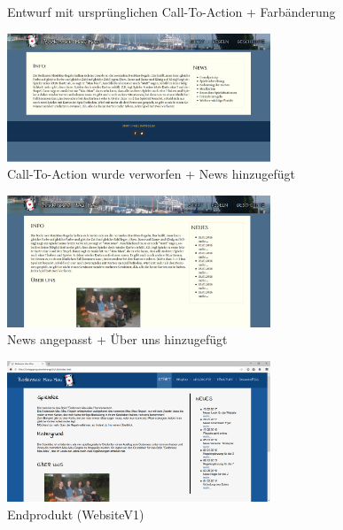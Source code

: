 \documentclass{scrartcl}
\begin{document}
\begin{enumerate}
\begin{description}
\begin{figure}[H]
\caption{Entwurf mit ursprünglichen Call-To-Action + Farbänderung}
\end{figure}
\begin{figure}[H]
 \centering
   \includegraphics[width=0.7\textwidth]{index2.png}
\caption{Call-To-Action wurde verworfen + News hinzugefügt}
\end{figure}
\begin{figure}[H]
 \centering
   \includegraphics[width=0.7\textwidth]{index3.png}
\caption{News angepasst + Über uns hinzugefügt}
\end{figure}
\begin{figure}[H]
 \centering
   \includegraphics[width=0.7\textwidth]{index4.png}
\caption{Endprodukt (WebsiteV1)}
\end{figure}


\end{description}
\end{enumerate}
\end{document}
